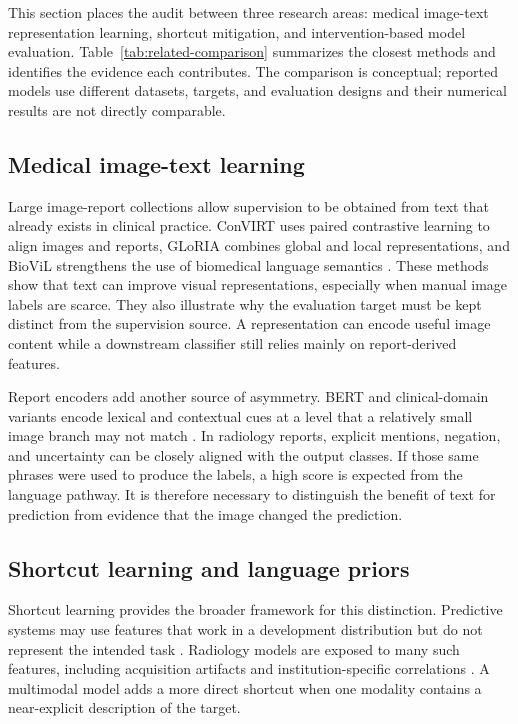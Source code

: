\documentclass[10pt,a4paper,twocolumn]{article}
\begin{document}
This section places the audit between three research areas: medical image-text
representation learning, shortcut mitigation, and intervention-based model
evaluation. Table~\ref{tab:related-comparison} summarizes the closest methods
and identifies the evidence each contributes. The comparison is conceptual;
reported models use different datasets, targets, and evaluation designs and
their numerical results are not directly comparable.

\subsection{Medical image-text learning}

Large image-report collections allow supervision to be obtained from text that
already exists in clinical practice. ConVIRT uses paired contrastive learning
to align images and reports, GLoRIA combines global and local representations,
and BioViL strengthens the use of biomedical language semantics
\cite{zhang2022convirt,huang2021gloria,boecking2022textsemantics}. These methods
show that text can improve visual representations, especially when manual image
labels are scarce. They also illustrate why the evaluation target must be kept
distinct from the supervision source. A representation can encode useful image
content while a downstream classifier still relies mainly on report-derived
features.

Report encoders add another source of asymmetry. BERT and clinical-domain
variants encode lexical and contextual cues at a level that a relatively small
image branch may not match \cite{devlin2019bert,alsentzer2019clinicalbert}. In
radiology reports, explicit mentions, negation, and uncertainty can be closely
aligned with the output classes. If those same phrases were used to produce the
labels, a high score is expected from the language pathway. It is therefore
necessary to distinguish the benefit of text for prediction from evidence that
the image changed the prediction.

\subsection{Shortcut learning and language priors}

Shortcut learning provides the broader framework for this distinction.
Predictive systems may use features that work in a development distribution but
do not represent the intended task \cite{geirhos2020shortcut}. Radiology models
are exposed to many such features, including acquisition artifacts and
institution-specific correlations \cite{gichoya2023shortcuts}. A multimodal
model adds a more direct shortcut when one modality contains a near-explicit
description of the target.
\end{document}

